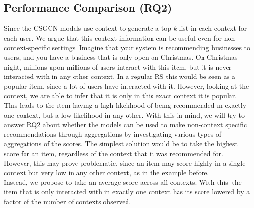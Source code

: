 \subsection{Performance Comparison (RQ2)}
Since the CSGCN models use context to generate a top-$k$ list in each context for each user.
We argue that this context information can be useful even for non-context-specific settings.
Imagine that your system is recommending businesses to users, and you have a business that is only open on Christmas.
On Christmas night, millions upon millions of users interact with this item, but it is never interacted with in any other context.
In a regular RS this would be seen as a popular item, since a lot of users have interacted with it.
However, looking at the context, we are able to infer that it is only in this exact context it is popular.
This leads to the item having a high likelihood of being recommended in exactly one context, but a low likelihood in any other.
With this in mind, we will try to answer RQ2 about whether the models can be used to make non-context specific recommendations through aggregations by investigating various types of aggregations of the scores.
The simplest solution would be to take the highest score for an item, regardless of the context that it was recommended for.
However, this may prove problematic, since an item may score highly in a single context but very low in any other context, as in the example before.\\
Instead, we propose to take an average score across all contexts.
With this, the item that is only interacted with in exactly one context has its score lowered by a factor of the number of contexts observed.

